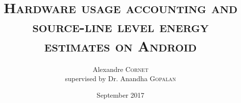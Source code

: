 
\title[Project presentation]{\textsc{Hardware usage accounting and source-line level energy estimates on Android}}
\author{Alexandre \textsc{Cornet}\\ {\footnotesize supervised by Dr. Anandha \textsc{Gopalan}}}
\date{September 2017}

\begin{frame}
\titlepage
{}
\end{frame}
%

%
%
